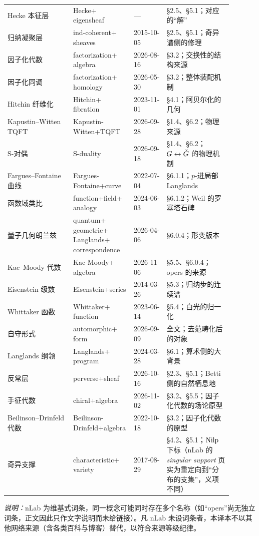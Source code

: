 {\begin{longtable}{@{}>{\raggedright\arraybackslash}p{0.26\linewidth}>{\raggedright\arraybackslash}p{0.24\linewidth}>{\raggedright\arraybackslash}p{0.13\linewidth}>{\raggedright\arraybackslash}p{0.26\linewidth}@{}}
Hecke 本征层 & Hecke+​\allowbreak eigensheaf & — & §2.5、§5.1；对应的“解” \\
归纳凝聚层 & ind-coherent+​\allowbreak sheaves & \mbox{2015-10-05} & §2.5、§5.1；奇异谱侧的修理 \\
因子化代数 & factorization+​\allowbreak algebra & \mbox{2026-08-16} & §3.2；交换性的结构来源 \\
因子化同调 & factorization+​\allowbreak homology & \mbox{2026-05-30} & §3.2；整体装配机制 \\
Hitchin 纤维化 & Hitchin+​\allowbreak fibration & \mbox{2023-11-01} & §4.1；阿贝尔化的几何 \\
Kapustin--Witten TQFT & Kapustin-Witten+​\allowbreak TQFT & \mbox{2026-09-28} & §1.4、§6.2；物理来源 \\
S-对偶 & S-duality & \mbox{2026-09-18} & §1.4、§6.2；$G\leftrightarrow\check{G}$ 的物理机制 \\
Fargues--Fontaine 曲线 & Fargues-Fontaine+​\allowbreak curve & \mbox{2022-07-04} & §6.1.1；$p$-进局部 Langlands \\
函数域类比 & function+​\allowbreak field+​\allowbreak analogy & \mbox{2024-06-03} & §6.1.2；Weil 的罗塞塔石碑 \\
量子几何朗兰兹 & quantum+​\allowbreak geometric+​\allowbreak Langlands+​\allowbreak correspondence & \mbox{2026-04-06} & §6.0.4；形变版本 \\
Kac--Moody 代数 & Kac-Moody+​\allowbreak algebra & \mbox{2026-11-06} & §5.5、§6.0.4；opers 的来源 \\
Eisenstein 级数 & Eisenstein+​\allowbreak series & \mbox{2014-03-26} & §5.3；归纳步的连续谱 \\
Whittaker 函数 & Whittaker+​\allowbreak function & \mbox{2023-06-14} & §5.4；白光的归一化 \\
自守形式 & automorphic+​\allowbreak form & \mbox{2026-09-09} & 全文；去范畴化后的对象 \\
Langlands 纲领 & Langlands+​\allowbreak program & \mbox{2024-03-28} & §6.1；算术侧的大背景 \\
反常层 & perverse+​\allowbreak sheaf & \mbox{2026-10-16} & §2.3、§5.1；Betti 侧的自然栖息地 \\
手征代数 & chiral+​\allowbreak algebra & \mbox{2026-11-02} & §3.2、§5.5；因子化代数的场论原型 \\
Beilinson--Drinfeld 代数 & Beilinson-Drinfeld+​\allowbreak algebra & \mbox{2022-10-18} & §3.2；因子化代数的原型 \\
奇异支撑 & characteristic+​\allowbreak variety & \mbox{2017-08-29} & §4.2、§5.1；$\operatorname{Nilp}$ 下标（nLab 的 \emph{singular support} 页实为重定向到“分布的支集”，义项不同） \\
\end{longtable}
}

\noindent\textit{说明：}nLab 为维基式词条，同一概念可能同时存在多个名称（如“opers”尚无独立词条，正文因此只作文字说明而未给链接）。凡 nLab 未设词条者，本译本不以其他网络来源（含各类百科与博客）替代，以符合来源等级纪律。
